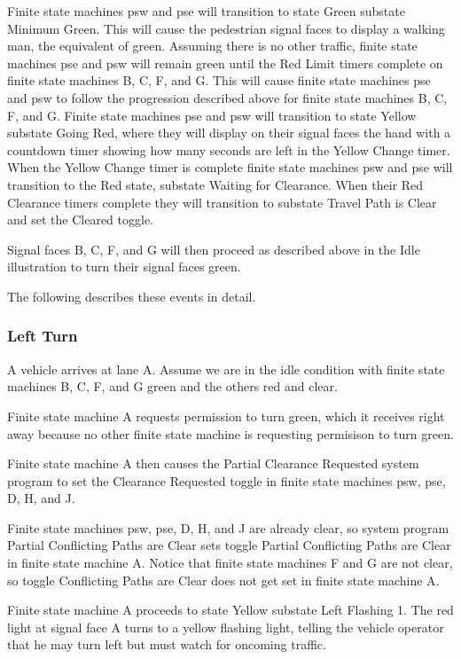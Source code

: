 \documentclass[letterpaper,twoside]{article}
\begin{document}
Finite state machines  psw and pse will transition to state Green substate
Minimum Green.
This will cause the pedestrian signal faces to display a walking man,
the equivalent of green.
Assuming there is no other traffic, finite state machines
pse and psw will remain green until the Red Limit timers complete on
finite state machines B, C, F, and G.
This will cause finite state machines pse and psw to follow the progression
described above for finite state machines B, C, F, and G.
Finite state machines pse and psw will transition to state Yellow
substate Going Red, where they will display on their signal faces
the hand with a countdown timer showing how many seconds are left
in the Yellow Change timer.  When the Yellow Change timer is complete
finite state machines psw and pse will transition to the
Red state, substate Waiting for Clearance.  When their Red Clearance timers
complete they will transition to substate Travel Path is Clear
and set the Cleared toggle.

Signal faces B, C, F, and G will then proceed as described above
in the Idle illustration to turn their signal faces green.

The following describes these events in detail.



\subsubsection{Left Turn}

A vehicle arrives at lane A.  Assume we are in the idle condition
with finite state machines B, C, F, and G green and the others red and clear.

Finite state machine A requests permission to turn green,
which it receives right away because no other finite state machine
is requesting permisison to turn green.

Finite state machine A then causes the Partial Clearance Requested system
program to set the Clearance Requested toggle in finite state machines
psw, pse, D, H, and J.

Finite state machines psw, pse, D, H, and J are already clear,
so system program Partial Conflicting Paths are Clear sets toggle
Partial Conflicting Paths are Clear in finite state machine A.
Notice that finite state machines F and G are not clear,
so toggle Conflicting Paths are Clear does not get set in
finite state machine A.

Finite state machine A proceeds to state Yellow substate Left Flashing 1.
The red light at signal face A turns to a yellow flashing light,
telling the vehicle operator that he may turn left but must watch for
oncoming traffic.
\end{document}
